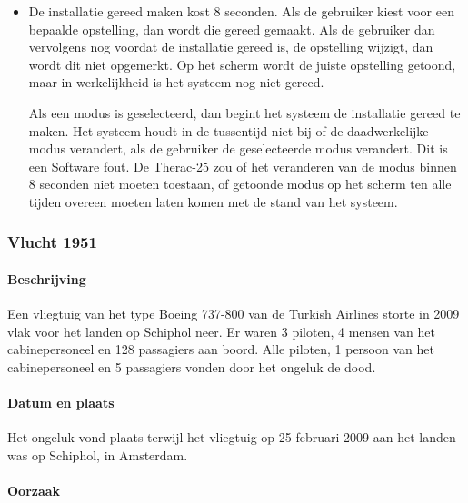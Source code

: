 \documentclass{article}
\begin{document}
\begin{itemize}
					\item De installatie gereed maken kost 8 seconden. Als de gebruiker kiest voor een bepaalde opstelling, dan wordt die gereed gemaakt. Als de gebruiker dan vervolgens nog voordat de installatie gereed is, de opstelling wijzigt, dan wordt dit niet opgemerkt. Op het scherm wordt de juiste opstelling getoond, maar in werkelijkheid is het systeem nog niet gereed. \par

						Als een modus is geselecteerd, dan begint het systeem de installatie gereed te maken. Het systeem houdt in de tussentijd niet bij of de daadwerkelijke modus verandert, als de gebruiker de geselecteerde modus verandert. Dit is een Software fout. De Therac-25 zou of het veranderen van de modus binnen 8 seconden niet moeten toestaan, of getoonde modus op het scherm ten alle tijden overeen moeten laten komen met de stand van het systeem. \par
				\end{itemize}
			
			\subsubsection{Vlucht 1951}
				\paragraph{Beschrijving}

Een vliegtuig van het type Boeing 737-800 van de Turkish Airlines storte in 2009 vlak voor het landen op Schiphol neer. Er waren 3 piloten, 4 mensen van het cabinepersoneel en 128 passagiers aan boord. Alle piloten, 1 persoon van het cabinepersoneel en 5 passagiers vonden door het ongeluk de dood. \par

				\paragraph{Datum en plaats}

					Het ongeluk vond plaats terwijl het vliegtuig op 25 februari 2009 aan het landen was op Schiphol, in Amsterdam. \par

				\paragraph{Oorzaak}
\end{document}
